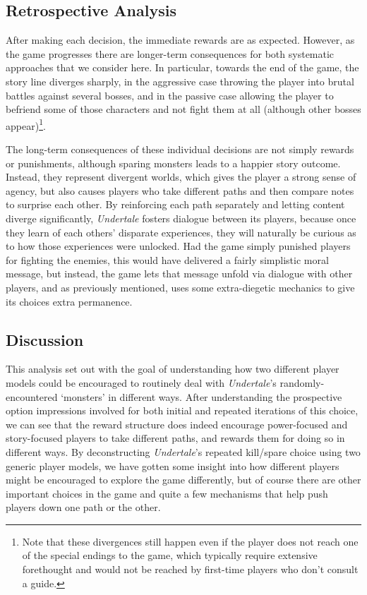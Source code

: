 \documentclass[arts,article,submit,moreauthors,pdftex,10pt,a4paper]{Definitions/mdpi}
\begin{document}
\subsection{Retrospective Analysis}

After making each decision, the immediate rewards are as expected.
%
However, as the game progresses there are longer-term consequences for both systematic approaches that we consider here.
%
In particular, towards the end of the game, the story line diverges sharply, in the aggressive case throwing the player into brutal battles against several bosses, and in the passive case allowing the player to befriend some of those characters and not fight them at all (although other bosses appear)\footnote{Note that these divergences still happen even if the player does not reach one of the special endings to the game, which typically require extensive forethought and would not be reached by first-time players who don't consult a guide.}.


The long-term consequences of these individual decisions are not simply rewards or punishments, although sparing monsters leads to a happier story outcome.
%
Instead, they represent divergent worlds, which gives the player a strong sense of agency, but also causes players who take different paths and then compare notes to surprise each other.
%
By reinforcing each path separately and letting content diverge significantly, \emph{Undertale} fosters dialogue between its players, because once they learn of each others' disparate experiences, they will naturally be curious as to how those experiences were unlocked.
%
Had the game simply punished players for fighting the enemies, this would have delivered a fairly simplistic moral message, but instead, the game lets that message unfold via dialogue with other players, and as previously mentioned, uses some extra-diegetic mechanics to give its choices extra permanence.


\subsection{Discussion}

This analysis set out with the goal of understanding how two different player models could be encouraged to routinely deal with \emph{Undertale}'s randomly-encountered `monsters' in different ways.
%
After understanding the prospective option impressions involved for both initial and repeated iterations of this choice, we can see that the reward structure does indeed encourage power-focused and story-focused players to take different paths, and rewards them for doing so in different ways.
%
By deconstructing \emph{Undertale}'s repeated kill/spare choice using two generic player models, we have gotten some insight into how different players might be encouraged to explore the game differently, but of course there are other important choices in the game and quite a few mechanisms that help push players down one path or the other.
\end{document}
